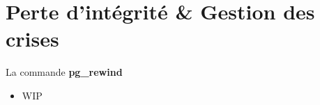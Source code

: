
\section{Perte d'intégrité & Gestion des crises}


\begin{frame}[fragile]{La commande \textbf{pg\_rewind}}

   \begin{itemize}
      \item WIP
   \end{itemize}

\begin{toile}
\end{toile}

\end{frame}

